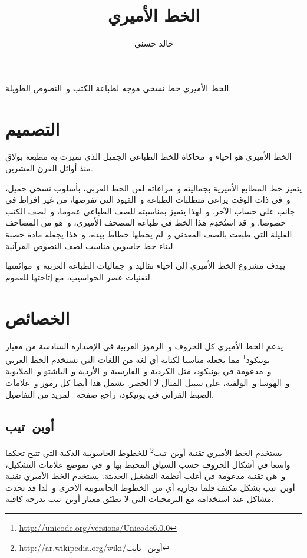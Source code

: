 \documentclass[a4paper]{article}
\title{الخط الأميري}
\author{خالد حسني}
\begin{document}
\pagecolor{pagecolor}
\color{textcolor}

\maketitle
\tableofcontents
\newpage


الخط الأميري خط نسخي موجه لطباعة الكتب و النصوص الطويلة.

\section{التصميم}
الخط الأميري هو إحياء و محاكاة للخط الطباعي الجميل الذي تميزت به مطبعة
بولاق منذ أوائل القرن العشرين.

يتميز خط المطابع الأميرية بجماليته و مراعاته لفن الخط العربي، بأسلوب
نسخي جميل، و في ذات الوقت يراعى متطلبات الطباعة و القيود التي تفرضها، من
غير إفراط في جانب على حساب الآخر. و لهذا يتميز بمناسبته للصف الطباعي
عموما، و لصف الكتب خصوصا. و قد استُخدِم هذا الخط في طباعة المصحف
الأميري، و هو من المصاحف القليلة التي طبعت بالصف المعدني و لم يخطها خطاط
بيده، و هذا يجعله مادة خصبة لبناء خط حاسوبي مناسب لصف النصوص القرآنية.

يهدف مشروع الخط الأميري إلى إحياء تقاليد و جماليات الطباعة العربية
و موائمتها لتقنيات عصر الحواسيب، مع إتاحتها للعموم.

\section{الخصائص}
يدعم الخط الأميري كل الحروف و الرموز العربية في الإصدارة السادسة من
معيار يونيكود\footnote{\url{http://unicode.org/versions/Unicode6.0.0}}
مما يجعله مناسبا لكتابة أي لغة من اللغات التي تستخدم الخط العربي
و مدعومة في يونيكود، مثل الكردية و الفارسية و الأردية و الباشتو
و الملايوية و الهوسا و الولفية، على سبيل المثال لا الحصر. يشمل هذا أيضا
كل رموز و علامات الضبط القرآني في يونيكود، راجع
صفحة \pageref{ref:quranic-text} لمزيد من التفاصيل.

\subsection{أوبن تيب}
يستخدم الخط الأميري تقنية
أوبن تيب\footnote{\url{http://ar.wikipedia.org/wiki/أوبن_تايب}} للخطوط
الحاسوبية الذكية التي تتيح تحكما واسعا في أشكال الحروف حسب السياق المحيط
بها و في تموضع علامات التشكيل، و هي تقنية مدعومة في أغلب أنظمة التشغيل
الحديثة. يستخدم الخط الأميري تقنية أوبن تيب بشكل مكثف قلما تجاريه أي من
الخطوط الحاسوبية الأخرى و لذا قد تحدث مشاكل عند استخدامه مع البرمجيات
التي لا تطبّق معيار أوبن تيب بدرجة كافية.
\end{document}
